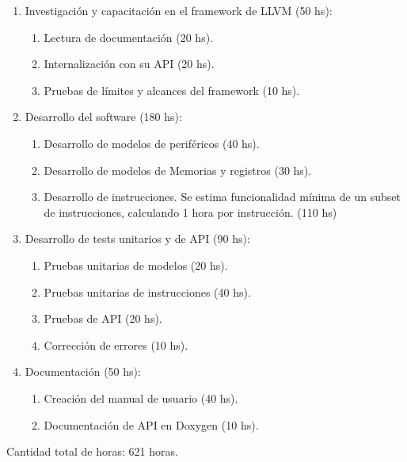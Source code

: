 \begin{enumerate}
\item Investigación y capacitación en el framework de LLVM (50 hs):

  \begin{enumerate}
  \item Lectura de documentación (20 hs).
  \item Internalización con su API (20 hs).
  \item Pruebas de límites y alcances del framework (10 hs).
  \end{enumerate}

\item Desarrollo del software (180 hs):

  \begin{enumerate}
  \item Desarrollo de modelos de periféricos (40 hs).
  \item Desarrollo de modelos de Memorias y registros (30 hs).
  \item Desarrollo de instrucciones. Se estima funcionalidad mínima de un subset de instrucciones, calculando 1 hora por instrucción. (110 hs)
  \end{enumerate}


\item Desarrollo de tests unitarios y de API (90 hs):

  \begin{enumerate}
  \item Pruebas unitarias de modelos (20 hs).
  \item Pruebas unitarias de instrucciones (40 hs).
  \item Pruebas de API (20 hs).
  \item Corrección de errores (10 hs).
  \end{enumerate}


\item Documentación (50 hs):

\begin{enumerate}
\item Creación del manual de usuario (40 hs).
\item Documentación de API en Doxygen (10 hs).
\end{enumerate}

\end{enumerate}


Cantidad total de horas: 621 horas.
